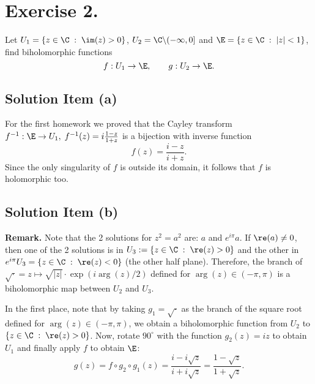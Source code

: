 
\section{Exercise 2.}

Let $U_1 = \{z\in \C \;:\; \im(z) > 0\}$, $U_2 = \C \backslash (-\infty,0]$ and $\E = \{z \in \C \;:\; |z| < 1\}$, find biholomorphic functions
\[ f : U_1 \to \E,\hspace{2em} g: U_2 \to \E. \]

\subsection*{Solution Item (a)}

For the first homework we proved that the Cayley transform $f^{-1}: \E \to U_1,\; f^{-1}(z) = i\frac{1-z}{1+z}$ is a bijection with inverse function
\[ f(z) = \frac{i-z}{i+z}. \]
Since the only singularity of $f$ is outside its domain, it follows that $f$ is holomorphic too.

\subsection*{Solution Item (b)}
\textbf{Remark.} Note that the 2 solutions for $z^2 = a^2$ are: $a$ and $e^{i\pi}a$. If $\re(a) \neq 0$, then one of the 2 solutions is in $U_3 :=\{z\in\C \;:\; \re(z) > 0\}$ and the other in $e^{i\pi} U_3 = \{z\in\C \;:\; \re(z) < 0\}$ (the other half plane). Therefore, the branch of $\sqrt{\cdot} = z\mapsto \sqrt{|z|} \cdot \exp(i \arg(z)/2)$ defined for $\arg(z) \in (-\pi,\pi)$ is a biholomorphic map between $U_2$ and $U_3$.

In the first place, note that by taking $g_1 = \sqrt{\cdot}$ as the branch of the square root defined for $\arg(z) \in (-\pi,\pi)$, we obtain a biholomorphic function from $U_2$ to $\{z \in \C \;:\; \re(z) > 0\}$. Now, rotate $90^\circ$ with the function $g_2(z) = iz$ to obtain $U_1$ and finally apply $f$ to obtain $\E$:
\[ g(z) = f\circ g_2 \circ g_1(z) = \frac{i-i\sqrt{z}}{i+i\sqrt{z}} = \frac{1-\sqrt{z}}{1+\sqrt{z}}. \]